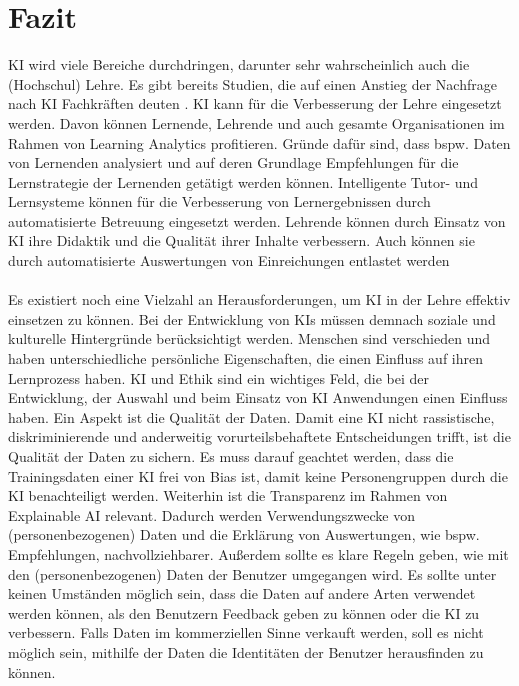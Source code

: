 \chapter{Fazit}
KI wird viele Bereiche durchdringen, darunter sehr wahrscheinlich auch die (Hochschul) Lehre.
Es gibt bereits Studien, die auf einen Anstieg der Nachfrage nach KI Fachkräften deuten \cite[S. 26]{Witt.2020}.
KI kann für die Verbesserung der Lehre eingesetzt werden. Davon können Lernende, Lehrende und auch gesamte Organisationen im Rahmen von Learning Analytics profitieren.
Gründe dafür sind, dass bspw. Daten von Lernenden analysiert und auf deren Grundlage Empfehlungen für die Lernstrategie der Lernenden getätigt werden können. %
Intelligente Tutor- und Lernsysteme können für die Verbesserung von Lernergebnissen durch automatisierte Betreuung eingesetzt werden. %
Lehrende können durch Einsatz von KI ihre Didaktik und die Qualität ihrer Inhalte verbessern.
Auch können sie durch automatisierte Auswertungen von Einreichungen entlastet werden \cite[S. 14ff]{Witt.2020}
\\
\\ \noindent
Es existiert noch eine Vielzahl an Herausforderungen, um KI in der Lehre effektiv einsetzen zu können.
Bei der Entwicklung von KIs müssen demnach soziale und kulturelle Hintergründe berücksichtigt werden.
Menschen sind verschieden und haben unterschiedliche persönliche Eigenschaften, die einen Einfluss auf ihren Lernprozess haben. \cite[S. 9ff]{Witt.2020}
KI und Ethik sind ein wichtiges Feld, die bei der Entwicklung, der Auswahl und beim Einsatz von KI Anwendungen einen Einfluss haben.
Ein Aspekt ist die Qualität der Daten. Damit eine KI nicht rassistische, diskriminierende und anderweitig vorurteilsbehaftete Entscheidungen trifft, ist die Qualität der Daten zu sichern.
Es muss darauf geachtet werden, dass die Trainingsdaten einer KI frei von Bias ist, damit keine Personengruppen durch die KI benachteiligt werden. \cite[S. 39]{Witt.2020}
Weiterhin ist die Transparenz im Rahmen von Explainable AI relevant. Dadurch werden Verwendungszwecke von (personenbezogenen) Daten und die Erklärung von Auswertungen, wie bspw. Empfehlungen, nachvollziehbarer. \cite[S.10f; S. 39ff]{Witt.2020}
Außerdem sollte es klare Regeln geben, wie mit den (personenbezogenen) Daten der Benutzer umgegangen wird.
Es sollte unter keinen Umständen möglich sein, dass die Daten auf andere Arten verwendet werden können, als den Benutzern Feedback geben zu können oder die KI zu verbessern.
Falls Daten im kommerziellen Sinne verkauft werden, soll es nicht möglich sein, mithilfe der Daten die Identitäten der Benutzer herausfinden zu können.
